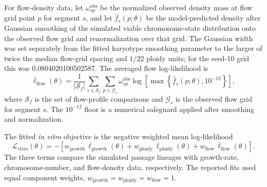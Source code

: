 \documentclass[11pt]{article}
\begin{document}
For flow-density data, let $\omega^{\mathrm{obs}}_{sp}$ be the normalized observed density mass at flow grid point $p$ for segment $s$, and let $\widehat f_s(p;\theta)$ be the model-predicted density after Gaussian smoothing of the simulated viable chromosome-state distribution onto the observed flow grid and renormalization over that grid. The Gaussian width was set separately from the fitted karyotype smoothing parameter to the larger of twice the median flow-grid spacing and $1/22$ ploidy units; for the seed-10 grid this was 0.0804020100502587. The averaged flow log-likelihood is
\begin{equation}
\bar\ell_{\mathrm{flow}}(\theta)
=
\frac{1}{|\mathcal S_f|}
\sum_{s\in\mathcal S_f}
\sum_{p\in\mathcal G_s}
 \omega^{\mathrm{obs}}_{sp}
 \log\left[\max\left\{\widehat f_s(p;\theta),10^{-12}\right\}\right],
\label{eq:appendix_invitro_flow_ll}
\end{equation}
where $\mathcal S_f$ is the set of flow-profile comparisons and $\mathcal G_s$ is the observed flow grid for segment $s$. The $10^{-12}$ floor is a numerical safeguard applied after smoothing and normalization.

The fitted \textit{in vitro} objective is the negative weighted mean log-likelihood
\begin{equation}
\mathcal L_{\mathrm{vitro}}(\theta)
=
-\left[
 w_{\mathrm{growth}}\,\bar\ell_{\mathrm{growth}}(\theta)
 +w_{\mathrm{ploidy}}\,\bar\ell_{\mathrm{ploidy}}(\theta)
 +w_{\mathrm{flow}}\,\bar\ell_{\mathrm{flow}}(\theta)
\right].
\label{eq:appendix_invitro_objective}
\end{equation}
The three terms compare the simulated passage lineages with growth-rate, chromosome-number, and flow-density data, respectively. The reported fits used equal component weights, $w_{\mathrm{growth}}=w_{\mathrm{ploidy}}=w_{\mathrm{flow}}=1$.
\end{document}
